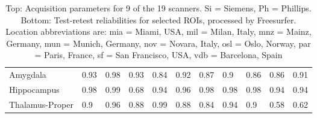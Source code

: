 \begin{table}
\begin{tabular}{lllllllllll}
Amygdala                      &   0.93 &   0.98 &   0.93 &   0.84 &   0.92 &   0.87 &    0.9 &   0.86 &   0.86 &   0.91 \\
Hippocampus                   &   0.98 &   0.99 &   0.68 &   0.94 &   0.96 &   0.98 &   0.98 &   0.98 &   0.94 &   0.94 \\
Thalamus-Proper               &    0.9 &   0.96 &   0.88 &   0.99 &   0.88 &   0.84 &   0.94 &    0.9 &   0.58 &   0.62 \\
\bottomrule
\end{tabular}
\caption{Top: Acquisition parameters for 9 of the 19 scanners. Si = Siemens, Ph = Phillips. Bottom: Test-retest reliabilities for selected ROIs, processed by Freesurfer. Location abbreviations are: mia = Miami, USA, mil = Milan, Italy, mnz = Mainz, Germany, mun = Munich, Germany, nov = Novara, Italy, osl = Oslo, Norway, par = Paris, France, sf = San Francisco, USA, vdb = Barcelona, Spain} 
\label{tab:acquisition2}

\end{table}
